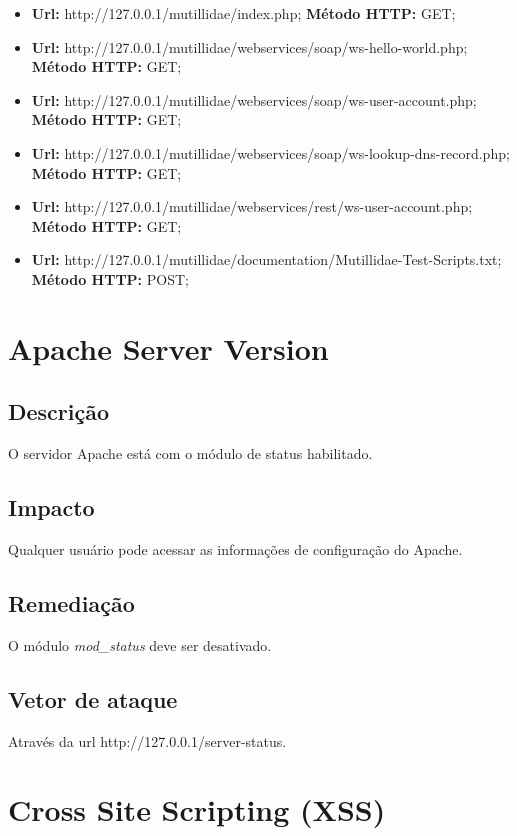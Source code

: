\documentclass{ufscThesis}
\newcommand{\+}{\discretionary{\mbox{${\bm\cdot}\mkern-1mu$}}{}{}}
\renewcommand\+{\discretionary{}{}{}}
\begin{document}
\begin{itemize}
\item \textbf{Url:} http://127.0.0.1/mutillidae/index.php; \textbf{Método HTTP:} GET;
\item \textbf{Url:} http://127.0.0.1/mutillidae/webservices/soap/ws-hello-world.php; \textbf{Método HTTP:} GET;
\item \textbf{Url:} http://127.0.0.1/mutillidae/webservices/soap/ws-user-account.php; \textbf{Método HTTP:} GET;
\item \textbf{Url:} http://127.0.0.1/mutillidae/webservices/soap/ws-lookup-dns-record.php; \textbf{Método HTTP:} GET;
\item \textbf{Url:} http://127.0.0.1/mutillidae/webservices/rest/ws-user-account.php; \textbf{Método HTTP:} GET;
\item \textbf{Url:} http://127.0.0.1/mutillidae/documentation/Mutillidae-Test-Scripts.txt; \textbf{Método HTTP:} POST;
\end{itemize}
\section{Apache Server Version}

\subsection{Descrição}

O servidor Apache está com o módulo de status habilitado.

\subsection{Impacto}

Qualquer usuário pode acessar as informações de configuração do Apache.

\subsection{Remediação}

O módulo \emph{mod\_status} deve ser desativado.

\subsection{Vetor de ataque}

Através da url http://127.0.0.1/server-status.

\section{Cross Site Scripting (XSS)}
\end{document}
